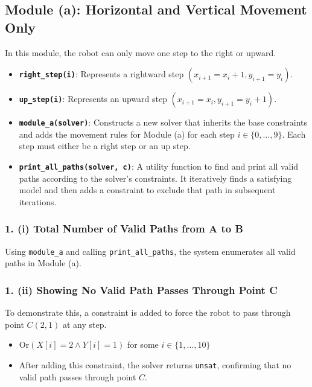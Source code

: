 \documentclass[11pt,a4paper
]{article}
\begin{document}
\subsection*{Module (a): Horizontal and Vertical Movement Only}

In this module, the robot can only move one step to the right or upward.

\begin{itemize}
  \item \textbf{\texttt{right\_step(i)}}: Represents a rightward step \( (x_{i+1} = x_i + 1, y_{i+1} = y_i) \).
  \item \textbf{\texttt{up\_step(i)}}: Represents an upward step \( (x_{i+1} = x_i, y_{i+1} = y_i + 1) \).
  \item \textbf{\texttt{module\_a(solver)}}: Constructs a new solver that inherits the base constraints and adds the movement rules for Module (a) for each step \( i \in \{0, \ldots, 9\} \). Each step must either be a right step or an up step.
  \item \textbf{\texttt{print\_all\_paths(solver, c)}}: A utility function to find and print all valid paths according to the solver's constraints. It iteratively finds a satisfying model and then adds a constraint to exclude that path in subsequent iterations.
\end{itemize}

\subsubsection*{1. (i) Total Number of Valid Paths from A to B}

Using \texttt{module\_a} and calling \texttt{print\_all\_paths}, the system enumerates all valid paths in Module (a).

\subsubsection*{1. (ii) Showing No Valid Path Passes Through Point C}

To demonstrate this, a constraint is added to force the robot to pass through point \( C(2,1) \) at any step.
\begin{itemize}
  \item \( \text{Or}(X[i] = 2 \land Y[i] = 1) \) for some \( i \in \{1, \ldots, 10\} \)
  \item After adding this constraint, the solver returns \texttt{unsat}, confirming that no valid path passes through point \( C \).
\end{itemize}
\end{document}
